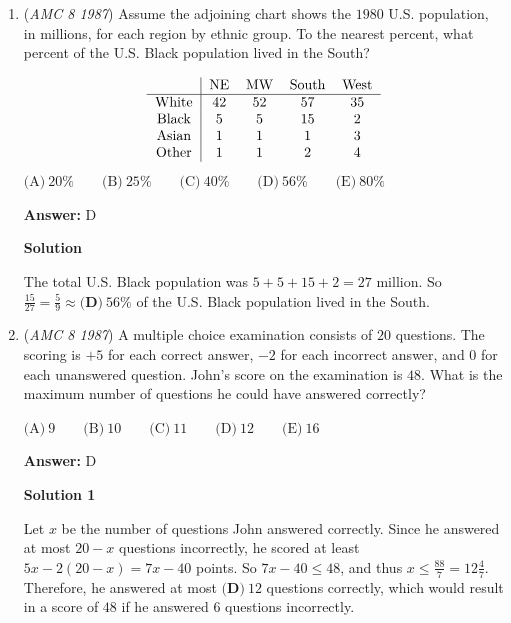 \begin{enumerate}
 Since $ABCD$ has area $3\cdot 4=12$, the shaded area is $\frac{25\pi}{4}-12 \approx \frac{25 \cdot 3.14}{4} - 12 = 7.625$, so the area is between $\boxed{\textbf{(D)}\ \text{7 and 8}}$.

 


	\item (\textit{AMC 8 1987}) Assume the adjoining chart shows the $1980$ U.S. population, in millions, for each region by ethnic group.  To the nearest percent, what percent of the U.S. Black population lived in the South?


 
 \[\begin{tabular}[t]{c|cccc}  & NE & MW & South & West \\ \hline White & 42 & 52 & 57 & 35 \\ Black & 5 & 5 & 15 & 2 \\ Asian & 1 & 1 & 1 & 3 \\ Other & 1 & 1 & 2 & 4  \end{tabular}\]
$\text{(A)}\ 20\% \qquad \text{(B)}\ 25\% \qquad \text{(C)}\ 40\% \qquad \text{(D)}\ 56\% \qquad \text{(E)}\ 80\%$

 \textbf{Answer: }D



\textbf{Solution}

The total U.S. Black population was $5+5+15+2=27$ million.  So $\frac{15}{27}= \frac{5}{9} \approx \boxed{\textbf{(D)}\ 56\%}$ of the U.S. Black population lived in the South.

 


	\item (\textit{AMC 8 1987}) A multiple choice examination consists of $20$ questions.  The scoring is $+5$ for each correct answer, $-2$ for each incorrect answer, and $0$ for each unanswered question.  John's score on the examination is $48$.  What is the maximum number of questions he could have answered correctly?


 $\text{(A)}\ 9 \qquad \text{(B)}\ 10 \qquad \text{(C)}\ 11 \qquad \text{(D)}\ 12 \qquad \text{(E)}\ 16$

 \textbf{Answer: }D



\textbf{Solution 1}

Let $x$ be the number of questions John answered correctly.  Since he answered at most $20-x$ questions incorrectly, he scored at least $5x - 2(20-x) = 7x - 40$ points.  So $7x - 40 \leq 48$, and thus $x \leq \frac{88}{7} = 12\frac{4}{7}$.  Therefore, he answered at most $\boxed{\textbf{(D)}\  12}$ questions correctly, which would result in a score of $48$ if he answered $6$ questions incorrectly.


\end{enumerate}
